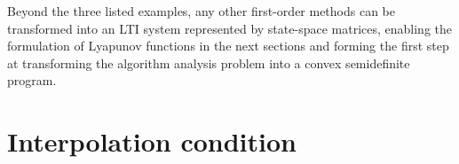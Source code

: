 \begin{table}[h!]
    \centering
\end{table}

Beyond the three listed examples, any other first-order methods can be transformed into an LTI system represented by state-space matrices, enabling the formulation of Lyapunov functions in the next sections and forming the first step at transforming the algorithm analysis problem into a convex semidefinite program.

\section{Interpolation condition} \label{constraint}

